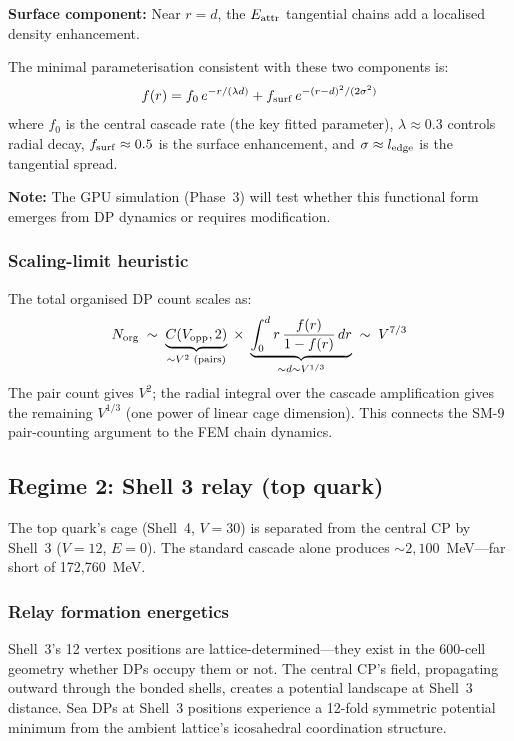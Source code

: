 \documentclass[11pt,letterpaper]{article}
\newcommand{\Norg}{N_{\rm org}}
\begin{document}
\textbf{Surface component:} Near $r = d$, the $E_{\rm attr}$
tangential chains add a localised density enhancement.

The minimal parameterisation consistent with these two components
is:
\begin{equation}
f(r) = f_0 \, e^{-r/(\lambda d)}
  + f_{\rm surf} \, e^{-(r-d)^2/(2\sigma^2)}
\label{eq:cascade}
\end{equation}
where $f_0$ is the central cascade rate (the key fitted parameter),
$\lambda \approx 0.3$ controls radial decay, $f_{\rm surf} \approx
0.5$ is the surface enhancement, and $\sigma \approx l_{\rm edge}$
is the tangential spread.

\textbf{Note:} The GPU simulation (Phase~3) will test whether this
functional form emerges from DP dynamics or requires modification.

\subsubsection{Scaling-limit heuristic}

The total organised DP count scales as:
\begin{equation}
\Norg \;\sim\; \underbrace{C(V_{\rm opp}, 2)}_{\sim V^2
  \text{ (pairs)}} \;\times\;
  \underbrace{\int_0^d r \, \frac{f(r)}{1 - f(r)} \, dr}_{%
  \sim d \sim V^{1/3}} \;\sim\; V^{7/3}
\label{eq:scaling}
\end{equation}
The pair count gives $V^2$; the radial integral over the cascade
amplification gives the remaining $V^{1/3}$ (one power of linear
cage dimension).  This connects the SM-9 pair-counting argument
to the FEM chain dynamics.

\subsection{Regime 2: Shell 3 relay (top quark)}
\label{sec:relay}

The top quark's cage (Shell~4, $V = 30$) is separated from the
central CP by Shell~3 ($V = 12$, $E = 0$).  The standard cascade
alone produces $\sim 2{,}100$~MeV---far short of 172,760~MeV.

\subsubsection{Relay formation energetics}

Shell~3's 12 vertex positions are lattice-determined---they exist
in the 600-cell geometry whether DPs occupy them or not.  The
central CP's field, propagating outward through the bonded shells,
creates a potential landscape at Shell~3 distance.  Sea DPs at
Shell~3 positions experience a 12-fold symmetric potential minimum
from the ambient lattice's icosahedral coordination structure.
\end{document}
